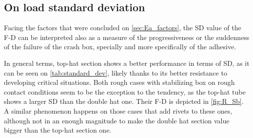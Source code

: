 \documentclass[cmfonts]{witpress}
\begin{document}
\subsection{On load standard deviation}

Facing the factors that were concluded on \cref{sec:Ea_factors}, the SD value of the F-D can be interpreted also as a measure of the progressiveness or the suddenness of the failure of the crash box, specially and more specifically of the adhesive.


In general terms, top-hat section shows a better performance in terms of SD, as it can be seen on \cref{tab:standard_dev}, likely thanks to its better resistance to developing critical situations. Both rough cases with stabilizing box on rough contact conditions seem to be the exception to the tendency, as the top-hat tube shows a larger SD than the double hat one. Their F-D is depicted in \cref{fig:R_Sb}. A similar phenomenon happens on those cases that add rivets to these ones, although not in an enough magnitude to make the double hat section value bigger than the top-hat section one.
\end{document}

